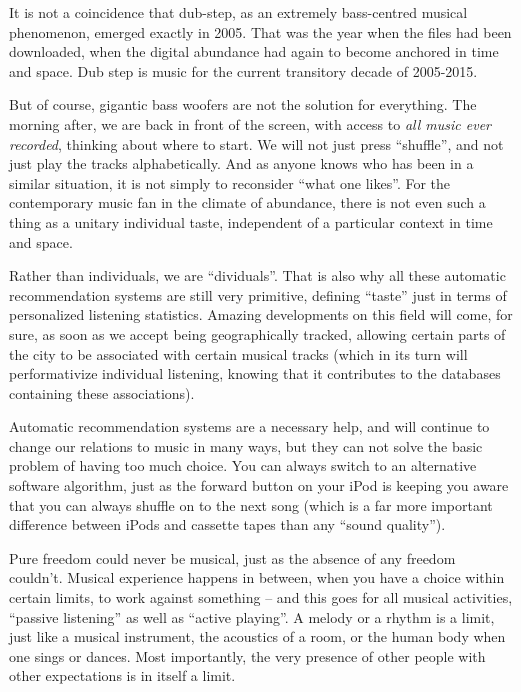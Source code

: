It is not a coincidence that dub-step, as an extremely bass-centred musical
phenomenon, emerged exactly in 2005. That was the year when the f\hbox{}iles had
been downloaded, when the digital abundance had again to become anchored in time
and space. Dub step is music for the current transitory decade of 2005-2015.

But of course, gigantic bass woofers are not the solution for everything. The
morning after, we are back in front of the screen, with access to \textit{all
music ever recorded}, thinking about where to start. We will not just press
``shuf\hbox{}f\hbox{}le'', and not just play the tracks alphabetically. And as
anyone knows who has been in a similar situation, it is not simply to reconsider
``what one likes''. For the contemporary music fan in the climate of abundance,
there is not even such a thing as a unitary individual taste, independent of a
particular context in time and space.

Rather than individuals, we are ``dividuals''. That is also why all these
automatic recommendation systems are still very primitive, def\hbox{}ining
``taste'' just in terms of personalized listening statistics. Amazing
developments on this f\hbox{}ield will come, for sure, as soon as we accept
being geographically tracked, allowing certain parts of the city to be
associated with certain musical tracks (which in its turn will performativize
individual listening, knowing that it contributes to the databases containing
these associations).

Automatic recommendation systems are a necessary help, and will continue to
change our relations to music in many ways, but they can not solve the basic
problem of having too much choice. You can always switch to an alternative
software algorithm, just as the forward button on your iPod is keeping you aware
that you can always shuf\hbox{}f\hbox{}le on to the next song (which is a far
more important dif\hbox{}ference between iPods and cassette tapes than any
``sound quality'').

Pure freedom could never be musical, just as the absence of any freedom
couldn't. Musical experience happens in between, when you have a choice within
certain limits, to work against something – and this goes for all musical
activities, ``passive listening'' as well as ``active playing''. A melody or a
rhythm is a limit, just like a musical instrument, the acoustics of a room, or
the human body when one sings or dances. Most importantly, the very presence of
other people with other expectations is in itself a limit.

